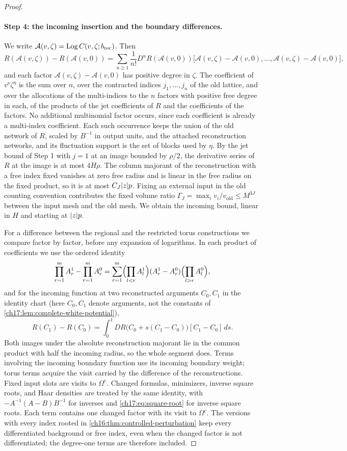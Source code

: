 \begin{proof}
\paragraph{Step 4: the incoming insertion and the boundary differences.}
We write $\mathcal A(v,\zeta)=\operatorname{Log} C(v,\zeta;b_{\mathrm{rec}})$. Then
\[
 R(\mathcal A(v,\zeta))-R(\mathcal A(v,0))=\sum_{n\ge1}\frac1{n!}D^nR(\mathcal A(v,0))\bigl[\mathcal A(v,\zeta)-\mathcal A(v,0),\ldots,\mathcal A(v,\zeta)-\mathcal A(v,0)\bigr],
\]
and each factor $\mathcal A(v,\zeta)-\mathcal A(v,0)$ has positive degree in $\zeta$. The coefficient of $v^\nu\zeta^\eta$ is the sum over $n$, over the contracted indices $j_1,\ldots,j_n$ of the old lattice, and over the allocations of the multi-indices to the $n$ factors with positive free degree in each, of the products of the jet coefficients of $R$ and the coefficients of the factors. No additional multinomial factor occurs, since each coefficient is already a multi-index coefficient. Each such occurrence keeps the union of the old network of $R$, scaled by $B^{-1}$ in output units, and the attached reconstruction networks, and its fluctuation support is the set of blocks used by $\eta$. By the jet bound of Step 1 with $j=1$ at an image bounded by $\rho/2$, the derivative series of $R$ at the image is at most $4H\rho$. The column majorant of the reconstruction with a free index fixed vanishes at zero free radius and is linear in the free radius on the fixed product, so it is at most $C_J\lvert z\rvert p$. Fixing an external input in the old counting convention contributes the fixed volume ratio $\Gamma_J=\max_iv_i/v_{\mathrm{old}}\le M^{3J}$ between the input mesh and the old mesh. We obtain the incoming bound, linear in $H$ and starting at $\lvert z\rvert p$.

For a difference between the regional and the restricted torus constructions we compare factor by factor, before any expansion of logarithms. In each product of coefficients we use the ordered identity
\[
 \prod_{r=1}^mA_r^1-\prod_{r=1}^mA_r^0=\sum_{r=1}^m\Bigl(\prod_{l<r}A_l^1\Bigr)(A_r^1-A_r^0)\Bigl(\prod_{l>r}A_l^0\Bigr),
\]
and for the incoming function at two reconstructed arguments $C_0,C_1$ in the identity chart (here $C_0,C_1$ denote arguments, not the constants of \cref{ch17:lem:complete-white-potential}),
\[
 R(C_1)-R(C_0)=\int_0^1DR\bigl(C_0+s(C_1-C_0)\bigr)[C_1-C_0]\,ds.
\]
Both images under the absolute reconstruction majorant lie in the common product with half the incoming radius, so the whole segment does. Terms involving the incoming boundary function use its incoming boundary weight; torus terms acquire the visit carried by the difference of the reconstructions. Fixed input slots are visits to $\Omega^c$. Changed formulas, minimizers, inverse square roots, and Haar densities are treated by the same identity, with $-A^{-1}(A-B)B^{-1}$ for inverses and \eqref{ch17:eq:square-root} for inverse square roots. Each term contains one changed factor with its visit to $\Omega^c$. The versions with every index rooted in \cref{ch16:thm:controlled-perturbation} keep every differentiated background or free index, even when the changed factor is not differentiated; the degree-one terms are therefore included.


\end{proof}
